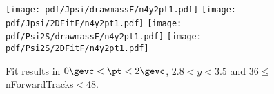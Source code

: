 \begin{figure}[H]
\begin{center}
\texttt{[image: pdf/Jpsi/drawmassF/n4y2pt1.pdf]}
\texttt{[image: pdf/Jpsi/2DFitF/n4y2pt1.pdf]}
\vspace*{-0.5cm}
\texttt{[image: pdf/Psi2S/drawmassF/n4y2pt1.pdf]}
\texttt{[image: pdf/Psi2S/2DFitF/n4y2pt1.pdf]}
\vspace*{-0.5cm}
\end{center}
\caption{Fit results in $0\gevc<\pt<2\gevc$, $2.8<y<3.5$ and 36$\leq$nForwardTracks$<$48.}
\label{Fitn4y2pt1}
\end{figure}
